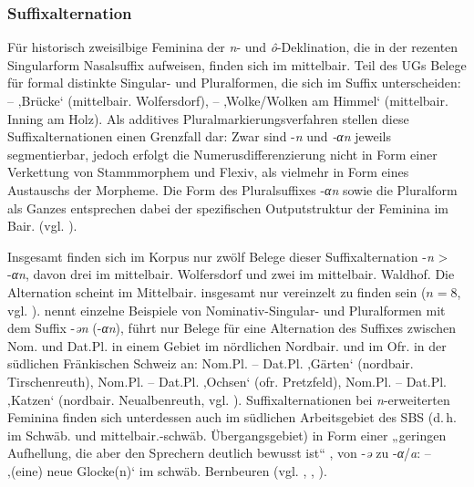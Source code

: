 \subsubsection{Suffixalternation}\label{sec:7.1.1.4}\largerpage
Für historisch zweisilbige Feminina der \textit{n}{}- und \textit{ô}{}-Deklination, die in der rezenten Singularform Nasalsuffix aufweisen, finden sich im mittelbair. Teil des UGs Belege für formal distinkte Singular- und Pluralformen, die sich im Suffix unterscheiden:  --  ‚Brücke‘ (mittelbair. Wolfersdorf),   --    ‚Wolke/Wolken am Himmel‘ (mittelbair. Inning am Holz). Als additives Pluralmarkierungsverfahren stellen diese Suffixalternationen einen Grenzfall dar: Zwar sind -\textit{n} und \textit{{}-αn} jeweils segmentierbar, jedoch erfolgt die Numerusdifferenzierung nicht in Form einer Verkettung von Stammmorphem und Flexiv, als vielmehr in Form eines Austauschs der Morpheme. Die Form des Pluralsuffixes -\textit{αn} sowie die Pluralform als Ganzes entsprechen dabei der spezifischen Outputstruktur der Feminina im Bair. (vgl. ).

Insgesamt finden sich im Korpus nur zwölf Belege dieser Suffixalternation \mbox{-\textit{n}} > -\textit{αn}, davon drei im mittelbair. Wolfersdorf und zwei im mittelbair. Waldhof. Die Alternation scheint im Mittelbair. insgesamt nur vereinzelt zu finden sein ($n=8$, vgl. \citealt[Karte 85 ‚Esche‘]{SOB4}). \citet[§572--573]{Schmeller1821} nennt einzelne Beispiele von Nominativ-Singular- und Pluralformen mit dem Suffix {}-\textit{ən} \mbox{(-\textit{αn})}, \citet[142]{Rowley1997} führt nur Belege für eine Alternation des Suffixes zwischen Nom. und Dat.Pl. in einem Gebiet im nördlichen Nordbair. und im Ofr. in der südlichen Fränkischen Schweiz an: Nom.Pl.  -- Dat.Pl.  ‚Gärten‘ (nordbair. Tirschenreuth), Nom.Pl.  -- Dat.Pl.  ‚Ochsen‘ (ofr. Pretzfeld), Nom.Pl.  -- Dat.Pl.  ‚Katzen‘ (nordbair. Neualbenreuth, vgl. ). Suffixalternationen bei \textit{n}{}-erweiterten Feminina finden sich unterdessen auch im südlichen Arbeitsgebiet des SBS (d.\,h. im Schwäb. und mittelbair.-schwäb. Übergangsgebiet) in Form einer „geringen Aufhellung, die aber den Sprechern deutlich bewusst ist“ \citep[64]{Freudenberg1959}, von -\textit{ə} zu -\textit{α}/\textit{a}:    --   ‚(eine) neue Glocke(n)‘ im schwäb. Bernbeuren (vgl. , \citealt[8]{Rowley1994}, \citealt[261--262 sowie Karten 105--113]{SBS9.1}).

